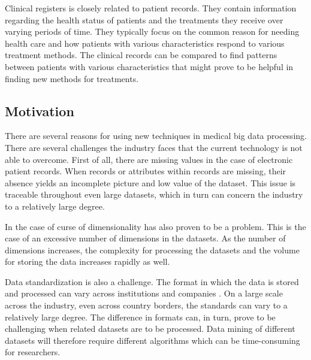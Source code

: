 Clinical registers is closely related to patient records.\cite{geir} They contain information regarding the health status of patients and the treatments they receive over varying periods of time. They typically focus on the common reason for needing health care and how patients with various characteristics respond to various treatment methods. 
The clinical records can be compared to find patterns between patients with various characteristics that might prove to be helpful in finding new methods for treatments.



\subsection{Motivation}
There are several reasons for using new techniques in medical big data processing. There are several challenges the industry faces that the current technology is not able to overcome. First of all, there are missing values in the case of electronic patient records\cite{wp}. When records or attributes within records are missing, their absence yields an incomplete picture and low value of the dataset. This issue is traceable throughout even large datasets, which in turn can concern the industry to a relatively large degree. 

In the case of curse of dimensionality has also proven to be a problem.
This is the case of an excessive number of dimensions in the datasets. As the number of dimensions increases, the complexity for processing the datasets and the volume for storing the data increases rapidly as well. 

Data standardization is also a challenge. The format in which the data is stored and processed can vary across institutions and companies . On a large scale across the industry, even across country borders, the standards can vary to a relatively large degree. The difference in formats can, in turn, prove to be challenging when related datasets are to be processed. Data mining of different datasets will therefore require different algorithms which can be time-consuming for researchers. 

